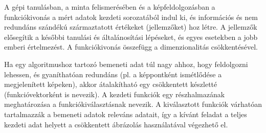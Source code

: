 




A gépi tanulásban, a minta felismerésében és a képfeldolgozásban a funkciókivonás a mért adatok kezdeti sorozatából indul ki, és információs és nem redundáns szándékú származtatott értékeket (jellemzőket) hoz létre. A jellemzők elősegítik a későbbi tanulási és általánosítási lépéseket, és egyes esetekben a jobb emberi értelmezést. A funkciókivonás\cite{features27:online} összefügg a dimenzionalitás csökkentésével.

Ha egy algoritmushoz tartozó bemeneti adat túl nagy ahhoz, hogy feldolgozni lehessen, és gyaníthatóan redundáns (pl. a képpontként ismétlődése a megjelenített képeken), akkor átalakítható egy csökkentett készletté (funkcióvektorként is nevezik). A kezdeti funkciók egy részhalmazának meghatározása a funkciókiválasztásnak nevezik. A kiválasztott funkciók várhatóan tartalmazzák a bemeneti adatok releváns adatait, így a kívánt feladat a teljes kezdeti adat helyett a csökkentett ábrázolás használatával végezhető el.

